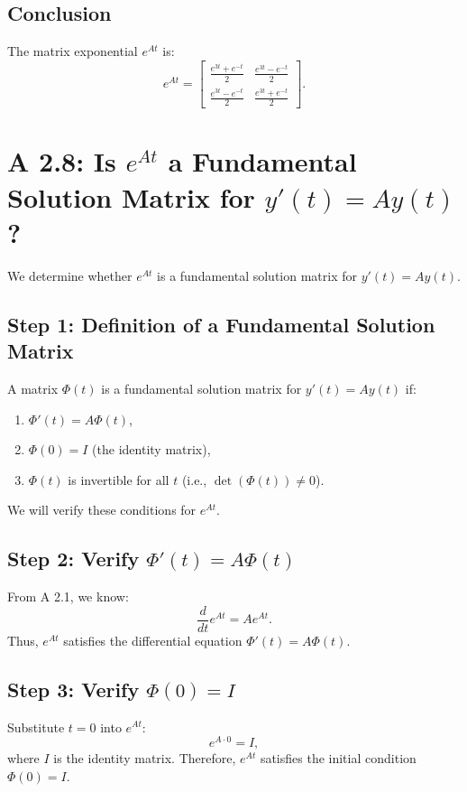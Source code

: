 \documentclass[12pt]{article}
\begin{document}
\subsection*{Conclusion}

The matrix exponential \(e^{At}\) is:
\[
e^{At} = \begin{bmatrix} 
\frac{e^{3t} + e^{-t}}{2} & \frac{e^{3t} - e^{-t}}{2} \\
\frac{e^{3t} - e^{-t}}{2} & \frac{e^{3t} + e^{-t}}{2}
\end{bmatrix}.
\]

\section*{A 2.8: Is \(e^{At}\) a Fundamental Solution Matrix for \(y'(t) = Ay(t)\)?}

We determine whether \(e^{At}\) is a fundamental solution matrix for \(y'(t) = Ay(t)\).

\subsection*{Step 1: Definition of a Fundamental Solution Matrix}

A matrix \(\Phi(t)\) is a fundamental solution matrix for \(y'(t) = Ay(t)\) if:
\begin{enumerate}
    \item \(\Phi'(t) = A \Phi(t)\),
    \item \(\Phi(0) = I\) (the identity matrix),
    \item \(\Phi(t)\) is invertible for all \(t\) (i.e., \(\det(\Phi(t)) \neq 0\)).
\end{enumerate}

We will verify these conditions for \(e^{At}\).

\subsection*{Step 2: Verify \(\Phi'(t) = A \Phi(t)\)}

From A 2.1, we know:
\[
\frac{d}{dt} e^{At} = A e^{At}.
\]
Thus, \(e^{At}\) satisfies the differential equation \(\Phi'(t) = A \Phi(t)\).

\subsection*{Step 3: Verify \(\Phi(0) = I\)}

Substitute \(t = 0\) into \(e^{At}\):
\[
e^{A \cdot 0} = I,
\]
where \(I\) is the identity matrix. Therefore, \(e^{At}\) satisfies the initial condition \(\Phi(0) = I\).
\end{document}
